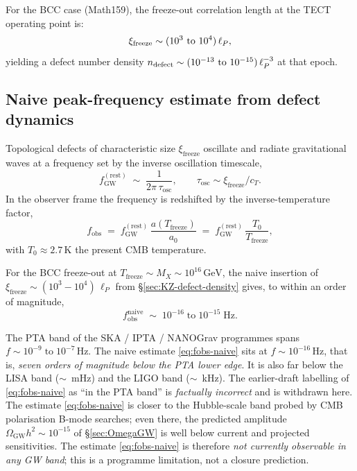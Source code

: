 For the BCC case (Math159), the freeze-out correlation length at the TECT operating
point is:
\begin{equation}
\xi_{\rm freeze} \sim (10^3 \text{ to } 10^4) \, \ell_P,
\end{equation}
yielding a defect number density $n_{\rm defect} \sim (10^{-13} \text{ to } 10^{-15}) \, \ell_P^{-3}$
at that epoch.

\subsection{Naive peak-frequency estimate from defect dynamics}
\label{sec:fpeak}

Topological defects of characteristic size
$\xi_{\mathrm{freeze}}$ oscillate and radiate gravitational waves at
a frequency set by the inverse oscillation timescale,
\begin{equation}\label{eq:fGW}
  f_{\mathrm{GW}}^{(\mathrm{rest})}
  \;\sim\; \frac{1}{2\pi\,\tau_{\mathrm{osc}}},
  \qquad
  \tau_{\mathrm{osc}}\sim \xi_{\mathrm{freeze}} / c_T.
\end{equation}
In the observer frame the frequency is redshifted by the
inverse-temperature factor,
\begin{equation}\label{eq:redshift}
  f_{\mathrm{obs}}
  \;=\; f_{\mathrm{GW}}^{(\mathrm{rest})}\,
        \frac{a(T_{\mathrm{freeze}})}{a_0}
  \;=\; f_{\mathrm{GW}}^{(\mathrm{rest})}\,
        \frac{T_0}{T_{\mathrm{freeze}}},
\end{equation}
with $T_0 \approx 2.7\,\mathrm{K}$ the present CMB temperature.

For the BCC freeze-out at $T_{\mathrm{freeze}} \sim M_X
\sim 10^{16}\,\mathrm{GeV}$, the naive insertion of
$\xi_{\mathrm{freeze}}\sim (10^3\!-\!10^4)\,\ell_P$ from
\S\ref{sec:KZ-defect-density} gives, to within an order of magnitude,
\begin{equation}\label{eq:fobs-naive}
  f_{\mathrm{obs}}^{\mathrm{naive}}
  \;\sim\; 10^{-16}\;\text{to}\;10^{-15}\;\mathrm{Hz}.
\end{equation}

\begin{remark}
\label{rmk:not-PTA}
The PTA band of the SKA / IPTA / NANOGrav programmes spans
$f\sim 10^{-9}\;\text{to}\;10^{-7}\,\mathrm{Hz}$. The naive estimate
\eqref{eq:fobs-naive} sits at $f \sim 10^{-16}\,\mathrm{Hz}$, that
is, \emph{seven orders of magnitude below the PTA lower edge}. It is
also far below the LISA band ($\sim$~mHz) and the LIGO band
($\sim$~kHz). The earlier-draft labelling of \eqref{eq:fobs-naive}
as ``in the PTA band'' is \emph{factually incorrect} and is
withdrawn here. The estimate \eqref{eq:fobs-naive} is closer to the
Hubble-scale band probed by CMB polarisation B-mode searches; even
there, the predicted amplitude $\Omega_{\mathrm{GW}}h^2\sim 10^{-15}$
of \S\ref{sec:OmegaGW} is well below current and projected
sensitivities. The estimate \eqref{eq:fobs-naive} is therefore
\emph{not currently observable in any GW band}; this is a programme
limitation, not a closure prediction.
\end{remark}

